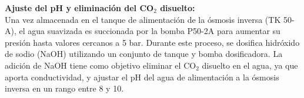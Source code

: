 \textbf{Ajuste del pH y eliminación del CO$_2$ disuelto: }\\
Una vez almacenada en el tanque de alimentación de la ósmosis inversa (TK 50-A), el agua suavizada es succionada por la
bomba P50-2A para aumentar su presión hasta valores cercanos a 5 bar. Durante este proceso, se dosifica hidróxido de sodio
(NaOH) utilizando un conjunto de tanque y bomba dosificadora. La adición de NaOH tiene como objetivo eliminar el CO$_2$ disuelto en
el agua, ya que aporta conductividad, y ajustar el pH del agua de alimentación a la ósmosis inversa en un rango entre 8 y 10.

